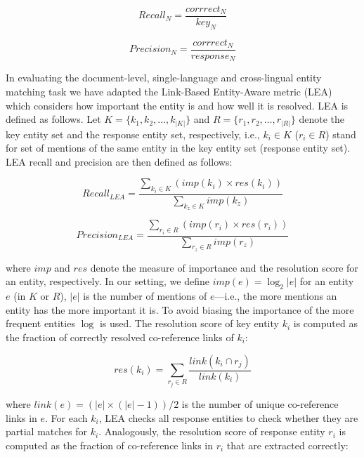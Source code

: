 \documentclass[11pt]{article}
\begin{document}
\begin{equation*}
	\mathit{Recall_{N}} = \frac{corrrect_{N}}{key_{N}}              
\end{equation*}

\begin{equation*}
	\mathit{Precision_{N}} = \frac{corrrect_{N}}{response_{N}}              
\end{equation*}


In evaluating the document-level, single-language and cross-lingual entity matching task we
have adapted the Link-Based Entity-Aware metric (LEA)~\cite{DBLP:conf-acl-Moosavi016} which
considers how important the entity is and how well it is resolved. 
%
LEA is defined as follows. 
%
Let $K = \{k_1,k_2,\ldots,k_{|K|} \}$ and $R = \{r_1,r_2,\ldots,r_{|R|} \}$ denote the key
entity set and the response entity set, respectively, i.e., $k_i \in K$ ($r_i \in R$) stand
for set of mentions of the same entity in the key entity set (response entity set). LEA recall
and precision are then defined as follows:

\begin{equation*}
	\mathit{Recall_{LEA}} = \frac{\sum_{k_{i} \in K} (\mathit{imp}(k_i) \times \mathit{res}(k_{i}))}
              {\sum_{k_{z} \in K} imp(k_{z})}
\end{equation*}

\begin{equation*}
	\mathit{Precision_{LEA}} = \frac{\sum_{r_{i} \in R} (\mathit{imp}(r_i) \times \mathit{res}(r_{i}))}
              {\sum_{r_{z} \in R} imp(r_{z})}
\end{equation*}

\noindent where $\mathit{imp}$ and $\mathit{res}$ denote the measure of importance and the
resolution score for an entity, respectively.  In our setting, we define
$\mathit{imp}(e) = \log_{2}|e|$ for an entity $e$ (in $K$ or $R$), $|e|$ is the number of
mentions of $e$---i.e., the more mentions an entity has the more important it is.  To avoid
biasing the importance of the more frequent entities $\log$ is used.  The resolution score of
key entity $k_i$ is computed as the fraction of correctly resolved co-reference links of
$k_i$:

\begin{equation*}
	\mathit{res}(k_i) = \sum_{r_{j} \in R} \frac{\mathit{link}(k_{i} \cap r_{j})}{\mathit{link}(k_{i})}
\end{equation*}

\noindent where $\mathit{link}(e) = (|e| \times (|e|-1))/2$ is the number
of unique co-reference links in $e$.  For each $k_i$, LEA checks all
response entities to check whether they are partial matches for
$k_i$. Analogously, the resolution score of response entity $r_i$ is
computed as the fraction of co-reference links in $r_i$ that are
extracted correctly:
\end{document}
